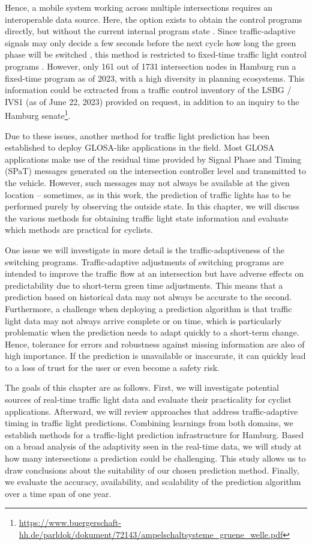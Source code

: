 Hence, a mobile system working across multiple intersections requires an interoperable data source. Here, the option exists to obtain the control programs directly, but without the current internal program state \cite{zweck_traffic_2013}. Since traffic-adaptive signals may only decide a few seconds before the next cycle how long the green phase will be switched \cite{islam_improved_2016}, this method is restricted to fixed-time traffic light control programs \cite{zweck_traffic_2013}. However, only 161 out of 1731 intersection nodes in Hamburg run a fixed-time program as of 2023, with a high diversity in planning ecosystems. This information could be extracted from a traffic control inventory of the LSBG / IVS1 (as of June 22, 2023) provided on request, in addition to an inquiry to the Hamburg senate\footnote{\url{https://www.buergerschaft-hh.de/parldok/dokument/72143/ampelschaltsysteme_gruene_welle.pdf}}.

Due to these issues, another method for traffic light prediction has been established to deploy GLOSA-like applications in the field. Most GLOSA applications make use of the residual time provided by Signal Phase and Timing (SPaT) messages generated on the intersection controller level and transmitted to the vehicle. However, such messages may not always be available at the given location -- sometimes, as in this work, the prediction of traffic lights has to be performed purely by observing the outside state. In this chapter, we will discuss the various methods for obtaining traffic light state information and evaluate which methods are practical for cyclists.

One issue we will investigate in more detail is the traffic-adaptiveness of the switching programs. Traffic-adaptive adjustments of switching programs are intended to improve the traffic flow at an intersection but have adverse effects on predictability due to short-term green time adjustments. This means that a prediction based on historical data may not always be accurate to the second. Furthermore, a challenge when deploying a prediction algorithm is that traffic light data may not always arrive complete or on time, which is particularly problematic when the prediction needs to adapt quickly to a short-term change. Hence, tolerance for errors and robustness against missing information are also of high importance. If the prediction is unavailable or inaccurate, it can quickly lead to a loss of trust for the user or even become a safety risk.

The goals of this chapter are as follows. First, we will investigate potential sources of real-time traffic light data and evaluate their practicality for cyclist applications. Afterward, we will review approaches that address traffic-adaptive timing in traffic light predictions. Combining learnings from both domains, we establish methods for a traffic-light prediction infrastructure for Hamburg. Based on a broad analysis of the adaptivity seen in the real-time data, we will study at how many intersections a prediction could be challenging. This study allows us to draw conclusions about the suitability of our chosen prediction method. Finally, we evaluate the accuracy, availability, and scalability of the prediction algorithm over a time span of one year.

